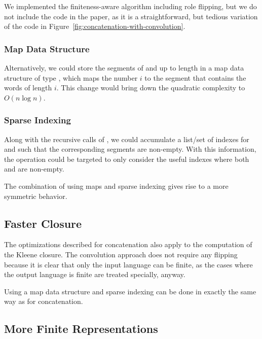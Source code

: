 We implemented the finiteness-aware algorithm including role flipping,
but we do not include the code in the paper, as it is a
straightforward, but tedious variation of the code in
Figure~\ref{fig:concatenation-with-convolution}. 

\subsubsection{Map Data Structure}
Alternatively, we could store the segments of  and 
up to length  in a map data structure of type
, which maps the number $i$ to the
segment that contains the words of length $i$. This change would bring
down the quadratic complexity to $O (n\log n)$. 

\subsubsection{Sparse Indexing}
Along with the recursive calls of , we could accumulate
a list/set of indexes for  and  such that the
corresponding segments are non-empty. With this information, the
 operation could be targeted to only consider the useful
indexes where both  and  are
non-empty.

The combination of using maps and sparse indexing gives rise to a
more symmetric behavior.

\subsection{Faster Closure}
\label{sec:faster-closure}

The optimizations described for concatenation also apply to the
computation of the Kleene closure. The convolution approach does not
require any flipping because it is clear that only the input language
can be finite, as the cases where the output language is finite are
treated specially, anyway.  

Using a map data structure and sparse indexing can be done in exactly
the same way as for concatenation.

\subsection{More Finite Representations}
\label{sec:more-finite-repr}

